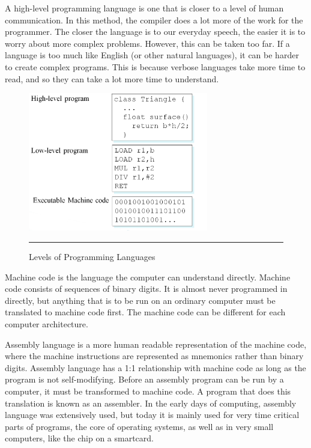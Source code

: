 A high-level programming language is one that is closer to a level of human communication. In this method, the compiler does a lot more of the work for the programmer. The closer the language is to our everyday speech, the easier it is to worry about more complex problems. However, this can be taken too far. If a language is too much like English (or other natural languages), it can be harder to create complex programs. This is because verbose languages take more time to read, and so they can take a lot more time to understand.
\begin{figure}[h!]
        \centering
                \includegraphics[width=0.7\textwidth]{./Pictures/lavels.jpg}
                  \rule{0.7\textwidth}{1pt}
        \caption{Levels of Programming Languages}
\end{figure}

Machine code is the language the computer can understand directly. Machine code consists of sequences of binary digits. It is almost never programmed in directly, but anything that is to be run on an ordinary computer must be translated to machine code first. The machine code can be different for each computer architecture.

Assembly language is a more human readable representation of the machine code, where the machine instructions are represented as mnemonics rather than binary digits. Assembly language has a 1:1 relationship with machine code as long as the program is not self-modifying. Before an assembly program can be run by a computer, it must be transformed to machine code. A program that does this translation is known as an assembler. In the early days of computing, assembly language was extensively used, but today it is mainly used for very time critical parts of programs, the core of operating systems, as well as in very small computers, like the chip on a smartcard.

